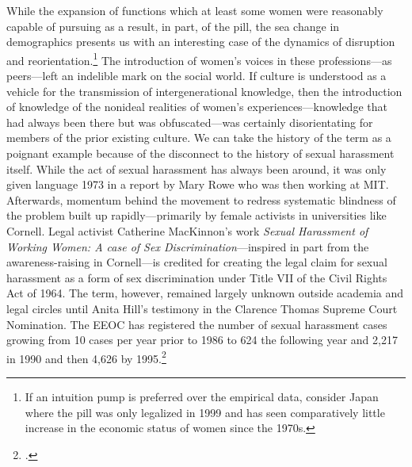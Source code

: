 \documentclass[letterpaper,notitlepage,12pt]{article}
\begin{document}
While the expansion of functions which at least some women were reasonably
capable of pursuing as a result, in part, of the pill, the sea change in
demographics presents us with an interesting case of the dynamics of disruption
and reorientation.\footnote{If an intuition pump is preferred over the empirical
  data, consider Japan where the pill was only legalized in 1999 and has seen
  comparatively little increase in the economic status of women since the
1970s.}
The introduction of women's voices in these professions---as peers---left an
indelible mark on the social world.
If culture is understood as a vehicle for the transmission of intergenerational
knowledge, then the introduction of knowledge of the nonideal realities of
women's experiences---knowledge that had always been there but was
obfuscated---was certainly disorientating for members of the prior existing
culture.
We can take the history of the term  as a poignant
example because of the disconnect to the history of sexual harassment itself.
While the act of sexual harassment has always been around, it was only given
language 1973 in a report  by Mary Rowe who was then
working at MIT.
Afterwards, momentum behind the movement to redress systematic blindness of the
problem built up rapidly---primarily by female activists in universities like
Cornell.
Legal activist Catherine MacKinnon's work \textit{Sexual Harassment of Working
Women: A case of Sex Discrimination}---inspired in part from the
awareness-raising in Cornell---is credited for creating the legal claim for
sexual harassment as a form of sex discrimination under Title VII of the Civil
Rights Act of 1964.
The term, however, remained largely unknown outside academia and legal circles
until Anita Hill's testimony in the Clarence Thomas Supreme Court Nomination.
The EEOC has registered the number of sexual harassment cases growing from 10
cases per year prior to 1986 to 624 the following year and 2,217 in 1990 and
then 4,626 by 1995.\footcite{cochran_sexual_2004}
\end{document}
